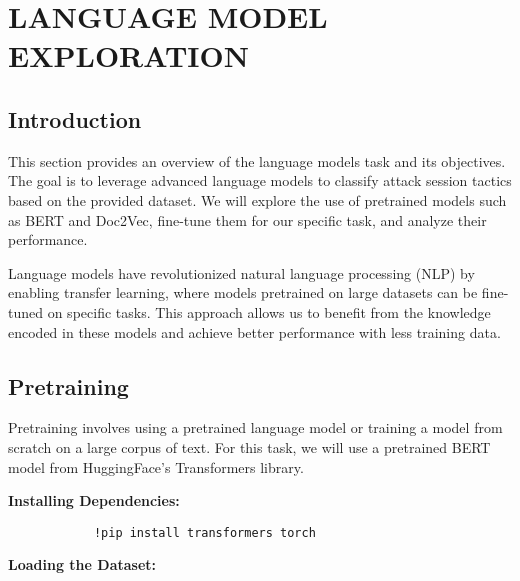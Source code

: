 

\section{LANGUAGE MODEL EXPLORATION}


    \subsection{Introduction}
    
        This section provides an overview of the language models task and its objectives. The goal is to leverage advanced language models to classify attack session tactics based on the provided dataset. We will explore the use of pretrained models such as BERT and Doc2Vec, fine-tune them for our specific task, and analyze their performance.

        Language models have revolutionized natural language processing (NLP) by enabling transfer learning, where models pretrained on large datasets can be fine-tuned on specific tasks. This approach allows us to benefit from the knowledge encoded in these models and achieve better performance with less training data.

    \subsection{Pretraining}
    
        Pretraining involves using a pretrained language model or training a model from scratch on a large corpus of text. For this task, we will use a pretrained BERT model from HuggingFace's Transformers library.

        \textbf{Installing Dependencies:}

        \begin{verbatim}
            !pip install transformers torch
        \end{verbatim}

        \textbf{Loading the Dataset:}

